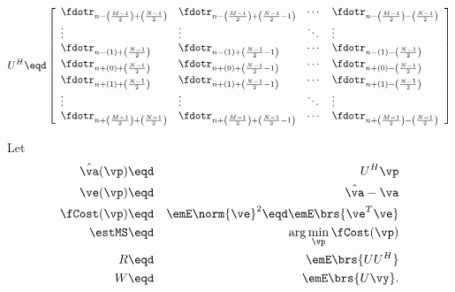 \[
   U^H \eqd
   \left[\begin{array}{llll}
      \fdotr_{n-\left(\frac{M-1}{2}\right)+\left(\frac{N-1}{2}\right)}    & \fdotr_{n-\left(\frac{M-1}{2}\right)+\left(\frac{N-1}{2}-1\right)}  & \cdots & \fdotr_{n-\left(\frac{M-1}{2}\right)-\left(\frac{N-1}{2}\right)}  \\
      \vdots                                                                & \vdots                                                                & \ddots & \vdots                                                                \\
      \fdotr_{n-(1)+\left(\frac{N-1}{2}\right)}                           & \fdotr_{n-(1)+\left(\frac{N-1}{2}-1\right)}                         & \cdots & \fdotr_{n-(1)-\left(\frac{N-1}{2}\right)}                         \\
      \fdotr_{n+(0)+\left(\frac{N-1}{2}\right)}                           & \fdotr_{n+(0)+\left(\frac{N-1}{2}-1\right)}                         & \cdots & \fdotr_{n+(0)-\left(\frac{N-1}{2}\right)}                         \\
      \fdotr_{n+(1)+\left(\frac{N-1}{2}\right)}                           & \fdotr_{n+(1)+\left(\frac{N-1}{2}-1\right)}                         & \cdots & \fdotr_{n+(1)-\left(\frac{N-1}{2}\right)}                         \\
      \vdots                                                                & \vdots                                                                & \ddots & \vdots                                                                \\
      \fdotr_{n+\left(\frac{M-1}{2}\right)+\left(\frac{N-1}{2}\right)}    & \fdotr_{n+\left(\frac{M-1}{2}\right)+\left(\frac{N-1}{2}-1\right)}  & \cdots & \fdotr_{n+\left(\frac{M-1}{2}\right)-\left(\frac{N-1}{2}\right)}
   \end{array}\right]
\]


Let
\begin{eqnarray*}
   \hat{\va}(\vp)   &\eqd& U^H\vp    \\
   \ve(\vp)    &\eqd& \hat{\va}-\va \\
   \fCost(\vp) &\eqd& \emE\norm{\ve}^2 \eqd \emE\brs{\ve^T\ve} \\
   \estMS      &\eqd& \arg\min_\vp \fCost(\vp)  \\
   R           &\eqd& \emE\brs{UU^H} \\
   W           &\eqd& \emE\brs{ U\vy}.
\end{eqnarray*}

